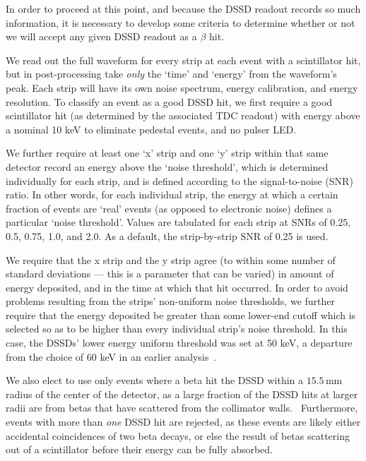 In order to proceed at this point, and because the DSSD readout records so much information, it is necessary to develop some criteria to determine whether or not we will accept any given DSSD readout as a $\beta$ hit.



We read out the full waveform for every strip at each event with a scintillator hit, but in post-processing take \emph{only} the `time' and `energy' from the waveform's peak.
Each strip will have its own noise spectrum, energy calibration, and energy resolution.  To classify an event as a good DSSD hit, we first require a good scintillator hit (as determined by the associated TDC readout) with energy above a nominal 10 keV to eliminate pedestal events, and no pulser LED.

	We further require at least one `x' strip and one `y' strip within that same detector record an energy above the `noise threshold', which is determined individually for each strip, and is defined according to the signal-to-noise (SNR) ratio.  In other words, for each individual strip, the energy at which a certain fraction of events are `real' events (as opposed to electronic noise) defines a particular `noise threshold'.  Values are tabulated for each strip at SNRs of 0.25, 0.5, 0.75, 1.0, and 2.0.  As a default, the strip-by-strip SNR of 0.25 is used.~  


	We require that the x strip and the y strip agree (to within some number of standard deviations --- this is a parameter that can be varied) in amount of energy deposited, and in the time at which that hit occurred.  In order to avoid problems resulting from the strips' non-uniform noise thresholds, we further require that the energy deposited be greater than some lower-end cutoff which is selected so as to be higher than every individual strip's noise threshold.  In this case, the DSSDs' lower energy uniform threshold was set at 50 keV, a departure from the choice of 60 keV in an earlier analysis~\cite{ben_Abeta,ben_thesis}.


We also elect to use only events where a beta hit the DSSD within a $15.5\,$mm radius of the center of the detector, as a large fraction of the DSSD hits at larger radii are from betas that have scattered from the collimator walls.~ Furthermore, events with more than \emph{one} DSSD hit are rejected, as these events are likely either accidental coincidences of two beta decays, or else the result of betas scattering out of a scintillator before their energy can be fully absorbed.  



